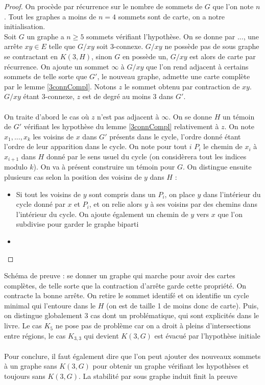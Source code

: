 \documentclass{scrartcl}
\begin{document}
\begin{flushleft}
\begin{proof}
    On procède par récurrence sur le nombre de sommets de $G$ que l'on note $n$.
    Tout les graphes a moins de $n = 4$ sommets sont de carte, on a notre initialisation.\\
    Soit $G$ un graphe a $n \geq 5$ sommets vérifiant l'hypothèse. On se donne par ..., une arrête $xy \in E$ telle que $G / xy$ soit $3$-connexe.
    $G / xy$ ne possède pas de sous graphe se contractant en $K(3, H)$, sinon $G$ en possède un, $G / xy$ est alors de carte par récurrence. On ajoute
    un sommet $\infty$ à $G / xy$ que l'on rend adjacent à certains sommets de telle sorte que $G'$, le nouveau graphe, admette une carte complète par
    le lemme \ref{3connCompl}. Notons $z$ le sommet obtenu par contraction de $xy$. $G / xy$ étant $3$-connexe, $z$ est de degré au moins $3$ dans $G'$.
    \\~\\
    On traite d'abord le cas où $z$ n'est pas adjacent à $\infty$. On se donne $H$ un témoin de $G'$ vérifiant les hypothèse du lemme \ref{3connCompl}
    relativement à $z$. On note $x_1, ..., x_k$ les voisins de $x$ dans $G'$ présents dans le cycle, l'ordre donné étant l'ordre de leur apparition
    dans le cycle. On note pour tout $i$ $P_i$ le chemin de $x_i$ à $x_{i+1}$ dans $H$ donné par le sens usuel du cycle (on considèrera tout les indices
    modulo $k$). On va à présent construire un témoin pour $G$. On distingue ensuite plusieurs cas selon la position des voisins de $y$ dans $H$ :
    \begin{itemize}
        \item Si tout les voisins de $y$ sont compris dans un $P_i$, on place $y$ dans l'intérieur du cycle donné par $x$ et $P_i$, et on
        relie alors $y$ à ses voisins par des chemins dans l'intérieur du cycle. On ajoute également un chemin de $y$ vers $x$ que l'on
        subdivise pour garder le graphe biparti

        \item 
    \end{itemize}
\end{proof}

Schéma de preuve : se donner un graphe qui marche pour avoir des cartes complètes, de telle sorte que la contraction d'arrête
garde cette propriété. On contracte la bonne arrête. On retire le sommet identifé et on identifie un cycle minimal qui
l'entoure dans le $H$ (on est de taille 1 de moins donc de carte). Puis, on distingue globalement $3$ cas dont un
problématique, qui sont explicités dans le livre. Le cas $K_5$ ne pose pas de problème car on a droit à pleins
d'intersections entre régions, le cas $K_{3,3}$ qui devient $K(3, G)$ est évacué par l'hypothèse initiale
\\~\\
Pour conclure, il faut également dire que l'on peut ajouter des nouveaux sommets à un graphe sans $K(3, G)$
pour obtenir un graphe vérifiant les hypothèses et toujours sans $K(3, G)$. La stabilité par sous graphe induit finit
la preuve
\end{flushleft}
\end{document}
